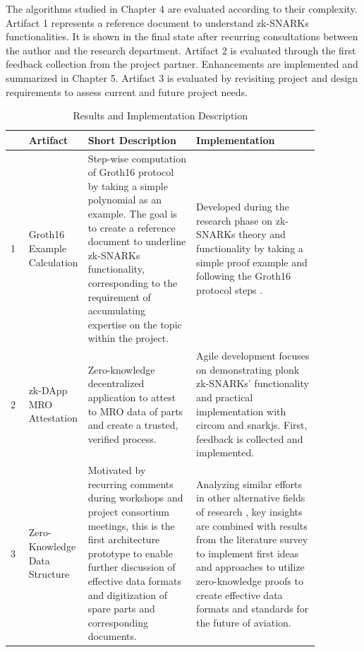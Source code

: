 The algorithms studied in Chapter 4 are evaluated according to their complexity. Artifact 1 represents a reference document to understand zk-SNARKs functionalities. It is shown in the final state after recurring consultations between the author and the research department. Artifact 2 is evaluated through the first feedback collection from the project partner. Enhancements are implemented and summarized in Chapter 5. Artifact 3 is evaluated by revisiting project and design requirements to assess current and future project needs. 

\setlength{\tabcolsep}{2ex}
\renewcommand{\arraystretch}{1.5}%
\begin{table}[htb]
	\centering
	    \caption{Results and Implementation Description}
		\begin{tabular}{|m{0.001\linewidth} | m{0.12\linewidth} | m{0.35\linewidth} | m{0.4\linewidth} |}
		\hline
		\textbf{}& \textbf{Artifact} & \textbf{Short Description} & \textbf{Implementation} \\ \hline
            1&Groth16 Example \newline Calculation & Step-wise computation of Groth16 protocol by taking a simple polynomial as an example. The goal is to create a reference document to underline zk-SNARKs functionality, corresponding to the requirement of accumulating expertise on the topic within the project. & Developed during the research phase on zk-SNARKs theory and functionality by taking a simple proof example and following the Groth16 protocol steps \citep{Groth2016OnTS}. \\  \hline
            2&zk-DApp MRO \newline Attestation & Zero-knowledge decentralized application to attest to MRO data of parts and create a trusted, verified process. & Agile development focuses on demonstrating plonk zk-SNARKs' functionality and practical implementation with circom and snarkjs. First, feedback is collected and implemented. \\ \hline 
            3&Zero-Knowledge Data \newline Structure & Motivated by recurring comments during workshops and project consortium meetings, this is the first architecture prototype to enable further discussion of effective data formats and digitization of spare parts and corresponding documents. & Analyzing similar efforts in other alternative fields of research \citep{sedlemeirgrenenergy}, key insights are combined with results from the literature survey to implement first ideas and approaches to utilize zero-knowledge proofs to create effective data formats and standards for the future of aviation. \\ \hline 
	\end{tabular}
\label{tab:summary_artifacts}
\end{table}
